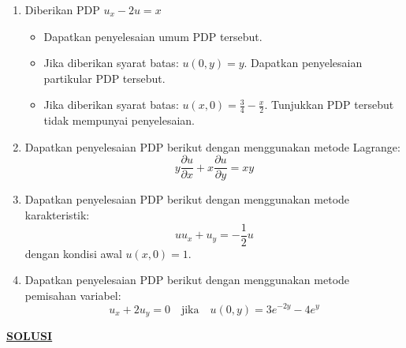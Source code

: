 \documentclass{article}
\theoremstyle{definition}
\begin{document}
\pagestyle{fancy}
\begin{enumerate}
  \item Diberikan PDP \( u_x - 2u = x \)
        \begin{itemize}
          \item[(a)] Dapatkan penyelesaian umum PDP tersebut.
          \item[(b)] Jika diberikan syarat batas: \( u(0,y) = y \). Dapatkan penyelesaian partikular PDP tersebut.
          \item[(c)] Jika diberikan syarat batas: \( u(x,0) = \frac{3}{4} - \frac{x}{2} \). Tunjukkan PDP tersebut tidak mempunyai penyelesaian.
        \end{itemize}

  \item Dapatkan penyelesaian PDP berikut dengan menggunakan metode Lagrange:
        \[
          y \frac{\partial u}{\partial x} + x \frac{\partial u}{\partial y} = xy
        \]

  \item Dapatkan penyelesaian PDP berikut dengan menggunakan metode karakteristik:
        \[
          uu_x + u_y = -\frac{1}{2}u
        \]
        dengan kondisi awal \( u(x,0) = 1 \).

  \item Dapatkan penyelesaian PDP berikut dengan menggunakan metode pemisahan variabel:
        \[
          u_x + 2u_y = 0 \quad \text{jika} \quad u(0,y) = 3e^{-2y} - 4e^y
        \]
\end{enumerate}
\centering\textbf{\underline{SOLUSI}}
\end{document}
